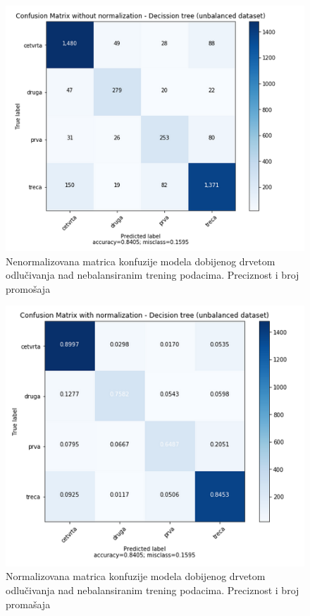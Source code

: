 \documentclass[a4paper]{article}
\begin{document}
\begin{figure}[h!]
\begin{center}
\includegraphics[scale=0.55]{drvo-nebalansirani-nenormalizovana-mat-konf.png}
\end{center}
\caption{Nenormalizovana matrica konfuzije modela dobijenog drvetom odlučivanja nad nebalansiranim trening podacima. Preciznost i broj promošaja}
\label{fig:mat_nebalansirana1}
\end{figure}

\newpage

\begin{figure}[h!]
\begin{center}
\includegraphics[scale=0.55]{drvo-nebalansirani-normalizovana-mat-konf.png}
\end{center}
\caption{Normalizovana matrica konfuzije modela dobijenog drvetom odlučivanja nad nebalansiranim trening podacima. Preciznost i broj promašaja}
\label{fig:mat_nebalansirana2}
\end{figure}
\end{document}
